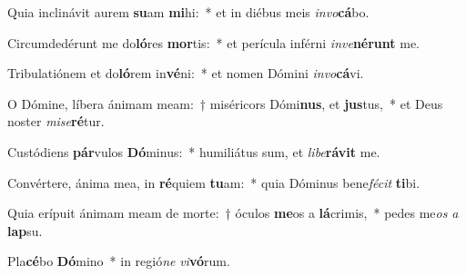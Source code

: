\item Quia inclinávit aurem \textbf{su}am \textbf{mi}hi:~* et in diébus meis \textit{in}\textit{vo}\textbf{cá}bo.
\item Circumdedérunt me do\textbf{ló}res \textbf{mor}tis:~* et perícula inférni \textit{in}\textit{ve}\textbf{né}\textbf{runt} me.
\item Tribulatiónem et do\textbf{ló}rem in\textbf{vé}ni:~* et nomen Dómini \textit{in}\textit{vo}\textbf{cá}vi.
\item O Dómine, líbera ánimam meam:~† miséricors Dómi\textbf{nus}, et \textbf{jus}tus,~* et Deus noster \textit{mi}\textit{se}\textbf{ré}tur.
\item Custódiens \textbf{pár}vulos \textbf{Dó}minus:~* humiliátus sum, et \textit{li}\textit{be}\textbf{rá}\textbf{vit} me.
\item Convértere, ánima mea, in \textbf{ré}quiem \textbf{tu}am:~* quia Dóminus bene\textit{fé}\textit{cit} \textbf{ti}bi.
\item Quia erípuit ánimam meam de morte:~† óculos \textbf{me}os a \textbf{lá}crimis,~* pedes me\textit{os} \textit{a} \textbf{lap}su.
\item Pla\textbf{cé}bo \textbf{Dó}mino~* in regió\textit{ne} \textit{vi}\textbf{vó}rum.
